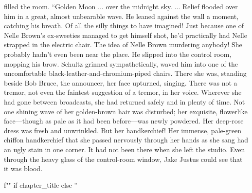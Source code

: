 \documentclass{novel}
\begin{document}
filled the room. “Golden Moon ... over the midnight sky. ... Relief flooded over him in a great, almost unbearable wave. He leaned against the wall a moment, catching his breath. Of all the silly things to have imagined! Just because one of Nelle Brown’s ex-sweeties managed to get himself shot, he’d practically had Nelle strapped in the electric chair. The idea of Nelle Brown murdering anybody! She probably hadn’t even been near the place. He slipped into the control room, mopping his brow. Schultz grinned sympathetically, waved him into one of the uncomfortable black-leather-and-chromium-piped chairs. There she was, standing beside Bob Bruce, the announcer, her face upturned, singing. There was not a tremor, not even the faintest suggestion of a tremor, in her voice. Wherever she had gone between broadcasts, she had returned safely and in plenty of time. Not one shining wave of her golden-brown hair was disturbed; her exquisite, flowerlike face—though as pale as it had been before—was newly powdered. Her deep-rose dress was fresh and unwrinkled. But her handkerchief! Her immense, pale-green chiffon handkerchief that she passed nervously through her hands as she sang had an ugly stain in one corner. It had not been there when she left the studio. Even through the heavy glass of the control-room window, Jake Justus could see that it was blood.

\begin{ChapterStart}
\vspace{3\nbs}
f"" if chapter_title else ''
\end{ChapterStart}
\end{document}
